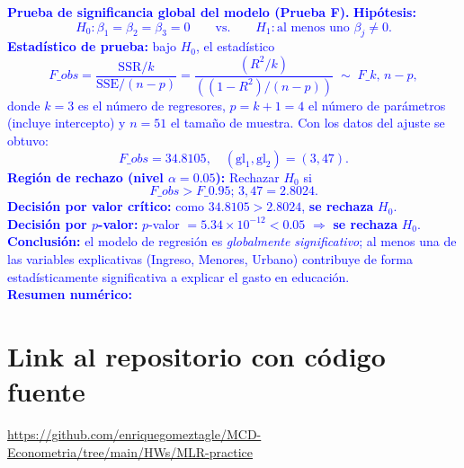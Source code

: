 \documentclass[10pt]{article}
\begin{document}
\textcolor{blue}{
    \textbf{Prueba de significancia global del modelo (Prueba F).}
    \textbf{Hipótesis:}\\[-2mm]
    \[
        H_0: \beta_1=\beta_2=\beta_3=0 \qquad \text{vs.} \qquad H_1: \text{al menos uno } \beta_j\neq 0.
    \]
    \textbf{Estadístico de prueba:} bajo $H_0$, el estadístico
    \[
        F\_{obs} 
        = \frac{\text{SSR}/k}{\text{SSE}/(n-p)}
        = \frac{(R^2/k)}{((1-R^2)/(n-p))}
        \;\sim\; F\_{k,\,n-p},
    \]
    donde $k=3$ es el número de regresores, $p=k+1=4$ el número de parámetros (incluye intercepto) y $n=51$ el tamaño de muestra. Con los datos del ajuste se obtuvo:
    \[
        F\_{obs}=34.8105, \quad (\mathrm{gl}_1,\mathrm{gl}_2)=(3,47).
    \]
    \textbf{Región de rechazo (nivel $\alpha=0.05$): } Rechazar $H_0$ si 
    \[
        F\_{obs} > F\_{0.95;\,3,47} = 2.8024.
    \]
    \textbf{Decisión por valor crítico:} como $34.8105 > 2.8024$, \textbf{se rechaza} $H_0$.\\
    \textbf{Decisión por $p$-valor:} $p$-valor $= 5.34\times 10^{-12} < 0.05$ \;$\Rightarrow$\; \textbf{se rechaza} $H_0$.\\
    \textbf{Conclusión:} el modelo de regresión es \emph{globalmente significativo}; al menos una de las variables explicativas (Ingreso, Menores, Urbano) contribuye de forma estadísticamente significativa a explicar el gasto en educación.\\
    \vspace{0.5cm}
    \noindent\textbf{Resumen numérico:}
    
    
}
\section{Link al repositorio con código fuente}
\url{https://github.com/enriquegomeztagle/MCD-Econometria/tree/main/HWs/MLR-practice}
\end{document}
